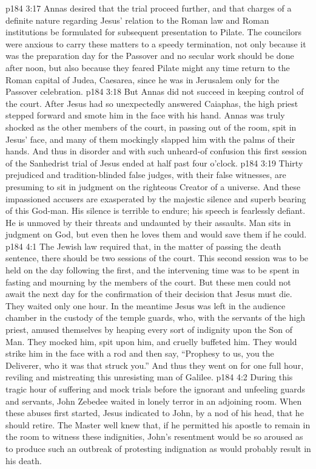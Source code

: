 \vs p184 3:17 Annas desired that the trial proceed further, and that charges of a definite nature regarding Jesus’ relation to the Roman law and Roman institutions be formulated for subsequent presentation to Pilate. The councilors were anxious to carry these matters to a speedy termination, not only because it was the preparation day for the Passover and no secular work should be done after noon, but also because they feared Pilate might any time return to the Roman capital of Judea, Caesarea, since he was in Jerusalem only for the Passover celebration.
\vs p184 3:18 But Annas did not succeed in keeping control of the court. After Jesus had so unexpectedly answered Caiaphas, the high priest stepped forward and smote him in the face with his hand. Annas was truly shocked as the other members of the court, in passing out of the room, spit in Jesus’ face, and many of them mockingly slapped him with the palms of their hands. And thus in disorder and with such unheard\hyp{}of confusion this first session of the Sanhedrist trial of Jesus ended at half past four o’clock.
\vs p184 3:19 \pc Thirty prejudiced and tradition\hyp{}blinded false judges, with their false witnesses, are presuming to sit in judgment on the righteous Creator of a universe. And these impassioned accusers are exasperated by the majestic silence and superb bearing of this God\hyp{}man. His silence is terrible to endure; his speech is fearlessly defiant. He is unmoved by their threats and undaunted by their assaults. Man sits in judgment on God, but even then he loves them and would save them if he could.
\vs p184 4:1 The Jewish law required that, in the matter of passing the death sentence, there should be two sessions of the court. This second session was to be held on the day following the first, and the intervening time was to be spent in fasting and mourning by the members of the court. But these men could not await the next day for the confirmation of their decision that Jesus must die. They waited only one hour. In the meantime Jesus was left in the audience chamber in the custody of the temple guards, who, with the servants of the high priest, amused themselves by heaping every sort of indignity upon the Son of Man. They mocked him, spit upon him, and cruelly buffeted him. They would strike him in the face with a rod and then say, “Prophesy to us, you the Deliverer, who it was that struck you.” And thus they went on for one full hour, reviling and mistreating this unresisting man of Galilee.
\vs p184 4:2 During this tragic hour of suffering and mock trials before the ignorant and unfeeling guards and servants, John Zebedee waited in lonely terror in an adjoining room. When these abuses first started, Jesus indicated to John, by a nod of his head, that he should retire. The Master well knew that, if he permitted his apostle to remain in the room to witness these indignities, John’s resentment would be so aroused as to produce such an outbreak of protesting indignation as would probably result in his death.
